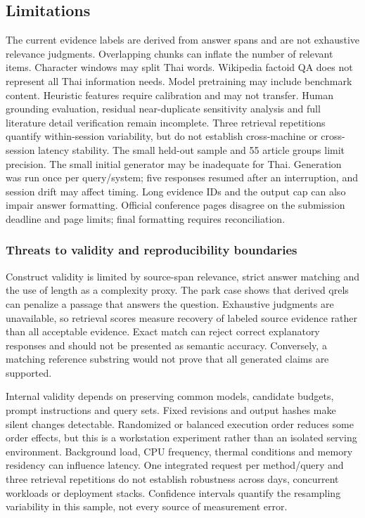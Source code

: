 \hypertarget{limitations}{%
\subsection{Limitations}\label{limitations}}

The current evidence labels are derived from answer spans and are not
exhaustive relevance judgments. Overlapping chunks can inflate the
number of relevant items. Character windows may split Thai words.
Wikipedia factoid QA does not represent all Thai information needs.
Model pretraining may include benchmark content. Heuristic features
require calibration and may not transfer. Human grounding evaluation,
residual near-duplicate sensitivity analysis and full literature detail
verification remain incomplete. Three retrieval repetitions quantify
within-session variability, but do not establish cross-machine or
cross-session latency stability. The small held-out sample and 55
article groups limit precision. The small initial generator may be
inadequate for Thai. Generation was run once per query/system; five
responses resumed after an interruption, and session drift may affect
timing. Long evidence IDs and the output cap can also impair answer
formatting. Official conference pages disagree on the submission
deadline and page limits; final formatting requires reconciliation.

\hypertarget{threats-to-validity-and-reproducibility-boundaries}{%
\subsubsection{Threats to validity and reproducibility
boundaries}\label{threats-to-validity-and-reproducibility-boundaries}}

Construct validity is limited by source-span relevance, strict answer
matching and the use of length as a complexity proxy. The park case
shows that derived qrels can penalize a passage that answers the
question. Exhaustive judgments are unavailable, so retrieval scores
measure recovery of labeled source evidence rather than all acceptable
evidence. Exact match can reject correct explanatory responses and
should not be presented as semantic accuracy. Conversely, a matching
reference substring would not prove that all generated claims are
supported.

Internal validity depends on preserving common models, candidate
budgets, prompt instructions and query sets. Fixed revisions and output
hashes make silent changes detectable. Randomized or balanced execution
order reduces some order effects, but this is a workstation experiment
rather than an isolated serving environment. Background load, CPU
frequency, thermal conditions and memory residency can influence
latency. One integrated request per method/query and three retrieval
repetitions do not establish robustness across days, concurrent
workloads or deployment stacks. Confidence intervals quantify the
resampling variability in this sample, not every source of measurement
error.

